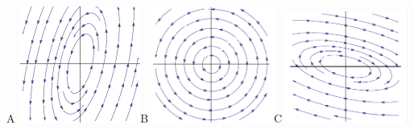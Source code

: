 \documentclass[epsf]{article}
\begin{document}
\begin{center}
A \includegraphics[width=40mm]{center1.png}\hspace{0.6 cm}B \includegraphics[width=40mm]{center2.png}\hspace{0.6cm}C \includegraphics[width=40mm]{center3.png}\\


\end{center}
\end{document}
